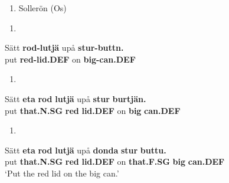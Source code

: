 \begin{enumerate} %
\item 
Sollerön (Os)

\end{enumerate} %
\setcounter{listLFOxcviiileveli}{0}
\begin{enumerate} %
\item 
\end{enumerate} %
\ea\label{}
\gll Sätt  \textbf{rod-lutjä} upå  \textbf{stur-buttn.}\\


put  \textbf{red-lid.DEF} on  \textbf{big-can.DEF}\\ %


\begin{enumerate} %
\item 
\end{enumerate} %
\ea\label{}
\gll Sätt  \textbf{eta}\textbf{  rod}\textbf{  lutjä} upå  \textbf{stur}\textbf{  burtjän.}\\


put  \textbf{that.N.SG} \textbf{red} \textbf{lid.DEF} on  \textbf{big} \textbf{can.DEF}\\ %


\begin{enumerate} %
\item 
\end{enumerate} %
\ea\label{}
\gll Sätt  \textbf{eta}\textbf{  rod}\textbf{  lutjä} upå  \textbf{donda}\textbf{  stur}\textbf{  buttu.}\\


put  \textbf{that.N.SG} \textbf{red} \textbf{lid.DEF} on  \textbf{that.F.SG} \textbf{big} \textbf{can.DEF}\\ %


‘Put the red lid on the big can.’
\z


